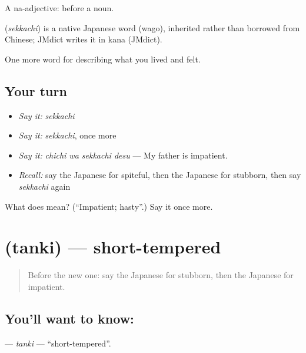A na-adjective:  before a noun.

\begin{cousinweb}
\textbf{} (\emph{sekkachi}) is a native Japanese word (wago), inherited rather than borrowed from Chinese; JMdict writes it in kana (JMdict).
\end{cousinweb}

\begin{grammarlens}[title={What you've built}]
One more word for describing what you lived and felt.
\end{grammarlens}

\subsection*{Your turn}
\begin{itemize}
\raggedright
  \item \emph{Say it:} \emph{sekkachi}
  \item \emph{Say it:} \emph{sekkachi}, once more
  \item \emph{Say it:} \emph{chichi wa sekkachi desu} — My father is impatient.
  \item \emph{Recall:} say the Japanese for spiteful, then the Japanese for stubborn, then say \emph{sekkachi} again
\end{itemize}

\begin{tcolorbox}[breakable,colback=teal!4,colframe=teal!35!black,title={Before you move on}]
What does  mean? (\textquotedblleft{}Impatient; hasty\textquotedblright{}.) Say it once more.
\end{tcolorbox}
\section[\texorpdfstring{\ja{たんき} (tanki)}{たんき (tanki)}]{ (tanki) — short-tempered}

\label{lesson:JA-C438-tanki}



\begin{quote}
Before the new one: say the Japanese for stubborn, then the Japanese for impatient.
\end{quote}

\subsection*{You'll want to know: }
\textbf{} — \emph{tanki} — \textquotedblleft{}short-tempered\textquotedblright{}.

